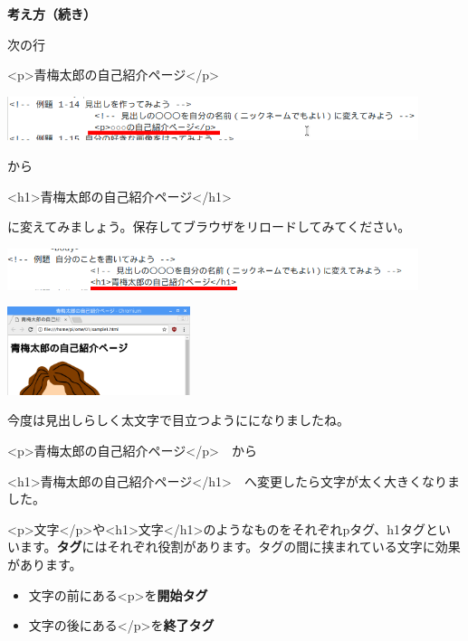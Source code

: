 \documentclass[a4paper,12pt]{jarticle}
\begin{document}
\clearpage
\flushleft
\textbf{考え方（続き）}




次の行

{\textless}p{\textgreater}青梅太郎の自己紹介ページ{\textless}/p{\textgreater}

\bigskip

\includegraphics[width=0.9\textwidth]{textbook-img158.png}

から

{\textless}h1{\textgreater}青梅太郎の自己紹介ページ{\textless}/h1{\textgreater}

に変えてみましょう。保存してブラウザをリロードしてみてください。


\bigskip

\includegraphics[width=0.9\textwidth]{textbook-img157.png}


\bigskip


\bigskip

\includegraphics[width=0.4\textwidth]{textbook-img156.png}


今度は見出しらしく太文字で目立つようにになりましたね。




\bigskip

{\textless}p{\textgreater}青梅太郎の自己紹介ページ{\textless}/p{\textgreater}　から

{\textless}h1{\textgreater}青梅太郎の自己紹介ページ{\textless}/h1{\textgreater}　へ変更したら文字が太く大きくなりました。


\bigskip

{\textless}p{\textgreater}文字{\textless}/p{\textgreater}や{\textless}h1{\textgreater}文字{\textless}/h1{\textgreater}のようなものをそれぞれpタグ、h1タグといいます。\textbf{タグ}にはそれぞれ役割があります。タグの間に挟まれている文字に効果があります。

\begin{itemize}
  \item 文字の前にある{\textless}p{\textgreater}を\textbf{開始タグ}
  \item 文字の後にある{\textless}/p{\textgreater}を\textbf{終了タグ}
\end{itemize}
\end{document}
